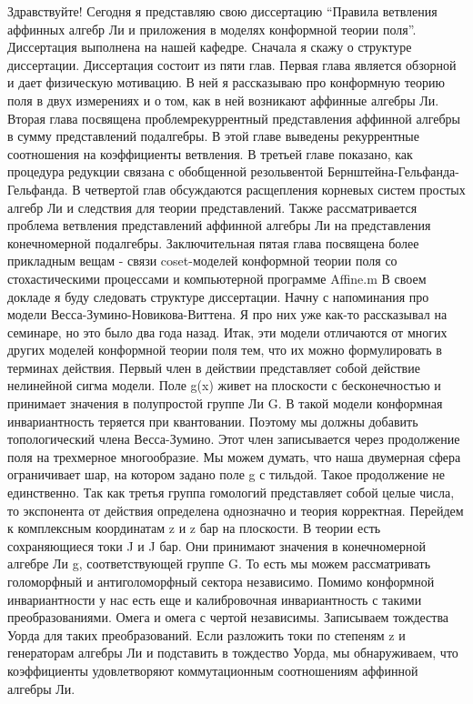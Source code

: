 \documentclass{article}
\begin{document}
Здравствуйте! Сегодня я представляю свою диссертацию ``Правила ветвления аффинных алгебр Ли и приложения в моделях конформной теории поля''. Диссертация выполнена на нашей кафедре. 
Сначала я скажу о структуре диссертации. Диссертация состоит из пяти глав. Первая глава является обзорной и дает физическую мотивацию. В ней я рассказываю про конформную теорию поля в двух измерениях и о том, как в ней возникают аффинные алгебры Ли. 
Вторая глава посвящена проблемрекуррентный представления аффинной алгебры в сумму представлений подалгебры. В этой главе выведены рекуррентные соотношения на коэффициенты ветвления. 
В третьей главе показано, как процедура редукции связана с обобщенной резольвентой Бернштейна-Гельфанда-Гельфанда. 
В четвертой глав обсуждаются расщепления корневых систем простых алгебр Ли и следствия для теории представлений. Также рассматривается проблема ветвления представлений аффинной алгебры Ли на представления конечномерной подалгебры. 
Заключительная пятая глава посвящена более прикладным вещам - связи coset-моделей конформной теории поля со стохастическими процессами и компьютерной программе Affine.m 
В своем докладе я буду следовать структуре диссертации. Начну с напоминания про модели Весса-Зумино-Новикова-Виттена. Я про них уже как-то рассказывал на семинаре, но это было два года назад. 
Итак, эти модели отличаются от многих других моделей конформной теории поля тем, что их можно формулировать в терминах действия. Первый член в действии представляет собой действие нелинейной сигма модели. Поле g(x) живет на плоскости с бесконечностью и принимает значения в полупростой группе Ли G. В такой модели конформная инвариантность теряется при квантовании. Поэтому мы должны добавить топологический члена Весса-Зумино. Этот член записывается через продолжение поля на трехмерное многообразие. Мы можем думать, что наша двумерная сфера ограничивает шар, на котором задано поле g с тильдой. Такое продолжение не единственно. Так как третья группа гомологий представляет собой целые числа, то экспонента от действия определена однозначно и теория корректная. 
Перейдем к комплексным координатам z и z бар на плоскости. В теории есть сохраняющиеся токи J и J бар. Они принимают значения в конечномерной алгебре Ли g, соответствующей группе G.  То есть мы можем рассматривать голоморфный и антиголоморфный сектора независимо. Помимо конформной инвариантности у нас есть еще и калибровочная инвариантность с такими преобразованиями. Омега и омега с чертой независимы. 
Записываем тождества Уорда для таких преобразований. Если разложить токи по степеням z и генераторам алгебры Ли и подставить в тождество Уорда, мы обнаруживаем, что коэффициенты удовлетворяют коммутационным соотношениям аффинной алгебры Ли.
\end{document}
